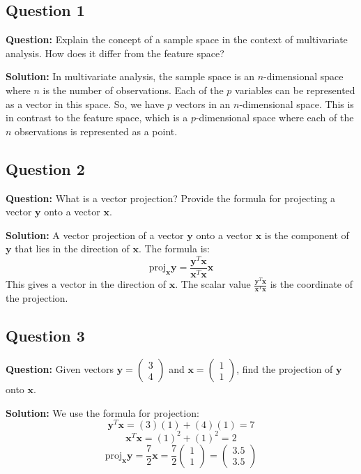 \subsection*{Question 1}
\textbf{Question:} Explain the concept of a sample space in the context of multivariate analysis. How does it differ from the feature space?

\textbf{Solution:}
In multivariate analysis, the sample space is an $n$-dimensional space where $n$ is the number of observations. Each of the $p$ variables can be represented as a vector in this space. So, we have $p$ vectors in an $n$-dimensional space. This is in contrast to the feature space, which is a $p$-dimensional space where each of the $n$ observations is represented as a point.

\subsection*{Question 2}
\textbf{Question:} What is a vector projection? Provide the formula for projecting a vector $\mathbf{y}$ onto a vector $\mathbf{x}$.

\textbf{Solution:}
A vector projection of a vector $\mathbf{y}$ onto a vector $\mathbf{x}$ is the component of $\mathbf{y}$ that lies in the direction of $\mathbf{x}$. The formula is:
$$ \text{proj}_{\mathbf{x}} \mathbf{y} = \frac{\mathbf{y}^T \mathbf{x}}{\mathbf{x}^T \mathbf{x}} \mathbf{x} $$
This gives a vector in the direction of $\mathbf{x}$. The scalar value $\frac{\mathbf{y}^T \mathbf{x}}{\mathbf{x}^T \mathbf{x}}$ is the coordinate of the projection.

\subsection*{Question 3}
\textbf{Question:} Given vectors $\mathbf{y} = \begin{pmatrix} 3 \\ 4 \end{pmatrix}$ and $\mathbf{x} = \begin{pmatrix} 1 \\ 1 \end{pmatrix}$, find the projection of $\mathbf{y}$ onto $\mathbf{x}$.

\textbf{Solution:}
We use the formula for projection:
$$ \mathbf{y}^T \mathbf{x} = (3)(1) + (4)(1) = 7 $$
$$ \mathbf{x}^T \mathbf{x} = (1)^2 + (1)^2 = 2 $$
$$ \text{proj}_{\mathbf{x}} \mathbf{y} = \frac{7}{2} \mathbf{x} = \frac{7}{2} \begin{pmatrix} 1 \\ 1 \end{pmatrix} = \begin{pmatrix} 3.5 \\ 3.5 \end{pmatrix} $$

